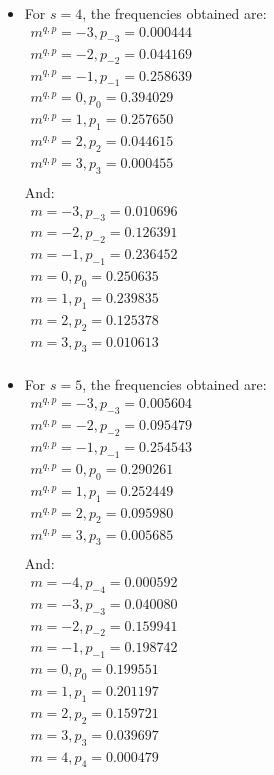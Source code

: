 \begin{enumerate}
\begin{itemize}
\item
For $s = 4$, the frequencies obtained are:\\
$
\begin{array}{l}
m^{q,p} = -3, p_{-3} = 0.000444 \\
m^{q,p} = -2, p_{-2} = 0.044169 \\
m^{q,p} = -1, p_{-1} = 0.258639 \\
m^{q,p} = 0, p_{0} = 0.394029 \\
m^{q,p} = 1, p_{1} = 0.257650 \\
m^{q,p} = 2, p_{2} = 0.044615 \\
m^{q,p} = 3, p_{3} = 0.000455 \\
\end{array}
$
\\And: \\
$
\begin{array}{l}
m = -3, p_{-3} = 0.010696 \\
m = -2, p_{-2} = 0.126391 \\
m = -1, p_{-1} = 0.236452 \\
m = 0, p_{0} = 0.250635 \\
m = 1, p_{1} = 0.239835 \\
m = 2, p_{2} = 0.125378 \\
m = 3, p_{3} = 0.010613 \\
\end{array}
$
\\

\item
For $s=5$, the frequencies obtained are: \\
$
\begin{array}{l}
m^{q,p} = -3, p_{-3} = 0.005604 \\
m^{q,p} = -2, p_{-2} = 0.095479 \\
m^{q,p} = -1, p_{-1} = 0.254543 \\
m^{q,p} = 0, p_{0} = 0.290261 \\
m^{q,p} = 1, p_{1} = 0.252449 \\
m^{q,p} = 2, p_{2} = 0.095980 \\
m^{q,p} = 3, p_{3} = 0.005685 \\
\end{array}
$
\\And: \\
$
\begin{array}{l}
m = -4, p_{-4} = 0.000592 \\
m = -3, p_{-3} = 0.040080 \\
m = -2, p_{-2} = 0.159941 \\
m = -1, p_{-1} = 0.198742 \\
m = 0, p_{0} = 0.199551 \\
m = 1, p_{1} = 0.201197 \\
m = 2, p_{2} = 0.159721 \\
m = 3, p_{3} = 0.039697 \\
m = 4, p_{4} = 0.000479 \\
\end{array}
$
\\


\end{itemize}
\end{enumerate}
